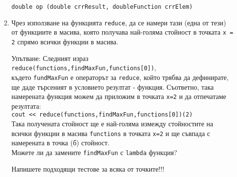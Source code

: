 \documentclass[12pt,a4paper]{article}
\begin{document}
\begin{enumerate}
\begin{enumerate}
\begin{mdframed}[hidealllines=true,backgroundcolor=gray!20]
				\texttt{double op (double crrResult, doubleFunction crrElem)}
		\end{mdframed}

		\item Чрез използване на функцията \texttt{reduce}, да се намери тази (една от тези) от функциите в масива, която получава най-голяма стойност в точката \texttt{x = 2} спрямо всички функции в масива.

		\begin{mdframed}[hidealllines=true,backgroundcolor=gray!20]
				Упътване: Следният израз\\

				\texttt{reduce(functions,findMaxFun,functions[0])},\\

				където \texttt{fundMaxFun} е операторът за \texttt{reduce}, който трябва да дефинирате, ще даде търсеният в условието резултат - функция. Съответно, така намерената функция можем да приложим в точката \texttt{x=2} и да отпечатаме резултата:\\

				\texttt{cout << reduce(functions,findMaxFun,functions[0])(2)}\\

				Така получената стойност ще е най-голяма измежду стойностите на всички функции в масива \texttt{functions} в точката \texttt{x=2} и ще съвпада с намерената в точка (б) стойност.\\

				Можете ли да замените \texttt{findMaxFun} с \texttt{lambda} функция?



		\end{mdframed}

		Напишете подходящи тестове за всяка от точките!!!

	\end{enumerate}


\end{enumerate}


	\vspace{20px}
\end{document}
